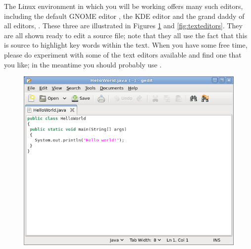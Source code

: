 The Linux environment in which you will be working offers many such
editors, including the default GNOME editor , the KDE
editor  and the grand daddy of all editors,
. These three are illustrated in Figures \ref{fig:gedit}
and \ref{fig:texteditors}. They are all shown ready to edit a
 source file; note that they all use the fact that this is
 source to highlight key words within the text. When you
have some free time, please do experiment with some of the text
editors available and find one that you like; in the meantime you
should probably use .

\begin{figure}
  \centering
\includegraphics[width=.7\textwidth]{images/gedit}
  \caption{}
  \label{fig:gedit}
\end{figure}

